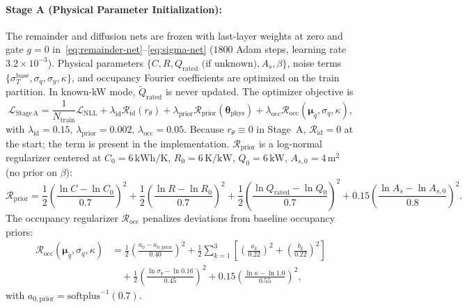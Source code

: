 \documentclass[11pt,letterpaper]{article}
\begin{document}
\paragraph{Stage A (Physical Parameter Initialization):} The remainder and diffusion nets are frozen with last-layer weights at zero and gate $g=0$ in~\eqref{eq:remainder-net}--\eqref{eq:sigma-net} ($1800$ Adam steps, learning rate $3.2\times 10^{-3}$). Physical parameters $\{C, R, Q_\mathrm{rated}\text{ (if unknown)}, A_s, \beta\}$, noise terms $\{\sigma_T^{\mathrm{base}}, \sigma_q, \sigma_y, \kappa\}$, and occupancy Fourier coefficients are optimized on the train partition. In known-kW mode, $\tilde{Q}_\mathrm{rated}$ is never updated. The optimizer objective is
\begin{equation}
\label{eq:stage-a-loss}
\mathcal{L}_\mathrm{Stage\,A} = \frac{1}{N_\mathrm{train}}\mathcal{L}_\mathrm{NLL} + \lambda_\mathrm{id}\mathcal{R}_\mathrm{id}(r_\theta) + \lambda_\mathrm{prior}\mathcal{R}_\mathrm{prior}(\bm{\theta}_\mathrm{phys}) + \lambda_\mathrm{occ}\mathcal{R}_\mathrm{occ}(\bm{\mu}_q, \sigma_q, \kappa),
\end{equation}
with $\lambda_\mathrm{id}=0.15$, $\lambda_\mathrm{prior}=0.002$, $\lambda_\mathrm{occ}=0.05$. Because $r_\theta\equiv 0$ in Stage~A, $\mathcal{R}_\mathrm{id}=0$ at the start; the term is present in the implementation. $\mathcal{R}_\mathrm{prior}$ is a log-normal regularizer centered at $C_0=6\,\mathrm{kWh/K}$, $R_0=6\,\mathrm{K/kW}$, $Q_0=6\,\mathrm{kW}$, $A_{s,0}=4\,\mathrm{m}^2$ (no prior on $\beta$):
\begin{equation}
\label{eq:r-prior}
\mathcal{R}_\mathrm{prior} = \frac{1}{2}\left(\frac{\ln C - \ln C_0}{0.7}\right)^2 + \frac{1}{2}\left(\frac{\ln R - \ln R_0}{0.7}\right)^2 + \frac{1}{2}\left(\frac{\ln Q_\mathrm{rated} - \ln Q_0}{0.7}\right)^2 + 0.15\left(\frac{\ln A_s - \ln A_{s,0}}{0.8}\right)^2.
\end{equation}
The occupancy regularizer $\mathcal{R}_\mathrm{occ}$ penalizes deviations from baseline occupancy priors:
\begin{equation}
\label{eq:r-occ}
\begin{aligned}
\mathcal{R}_\mathrm{occ}(\bm{\mu}_q, \sigma_q, \kappa) &= \frac{1}{2}\left(\frac{a_0 - a_{0,\mathrm{prior}}}{0.40}\right)^2 + \frac{1}{2}\sum_{k=1}^{3} \left[ \left(\frac{a_k}{0.22}\right)^2 + \left(\frac{b_k}{0.22}\right)^2 \right] \\
&\quad + \frac{1}{2}\left(\frac{\ln\sigma_q - \ln 0.16}{0.45}\right)^2 + 0.15\left(\frac{\ln\kappa - \ln 1.0}{0.55}\right)^2,
\end{aligned}
\end{equation}
with $a_{0,\mathrm{prior}}=\mathrm{softplus}^{-1}(0.7)$.
\end{document}

